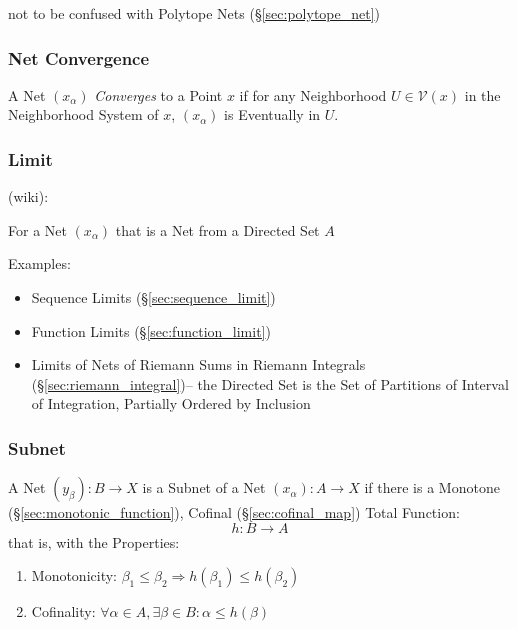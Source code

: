 \fist not to be confused with Polytope Nets (\S\ref{sec:polytope_net})



\subsubsection{Net Convergence}\label{sec:net_convergence}

A Net $(x_\alpha)$ \emph{Converges} to a Point $x$ if for any
Neighborhood $U \in \mathcal{V}(x)$ in the Neighborhood System of $x$,
$(x_\alpha)$ is Eventually in $U$.



\subsubsection{Limit}\label{sec:net_limit}

(wiki):

For a Net $(x_\alpha)$ that is a Net from a Directed Set $A$

Examples:

\begin{itemize}
  \item Sequence Limits (\S\ref{sec:sequence_limit})
  \item Function Limits (\S\ref{sec:function_limit})
  \item Limits of Nets of Riemann Sums in Riemann Integrals
    (\S\ref{sec:riemann_integral})-- the Directed Set is the Set of Partitions
    of Interval of Integration, Partially Ordered by Inclusion
\end{itemize}



\subsubsection{Subnet}\label{sec:subnet}

A Net $(y_\beta) : B \rightarrow X$ is a Subnet of a Net $(x_\alpha) :
A \rightarrow X$ if there is a Monotone
(\S\ref{sec:monotonic_function}), Cofinal (\S\ref{sec:cofinal_map})
Total Function:
\[
  h : B \rightarrow A
\]
that is, with the Properties:
\begin{enumerate}
  \item Monotonicity:
  $\beta_1 \leq \beta_2 \Rightarrow h(\beta_1) \leq h(\beta_2)$
  \item Cofinality:
   $\forall \alpha \in A, \exists \beta \in B : \alpha \leq h(\beta)$
\end{enumerate}



